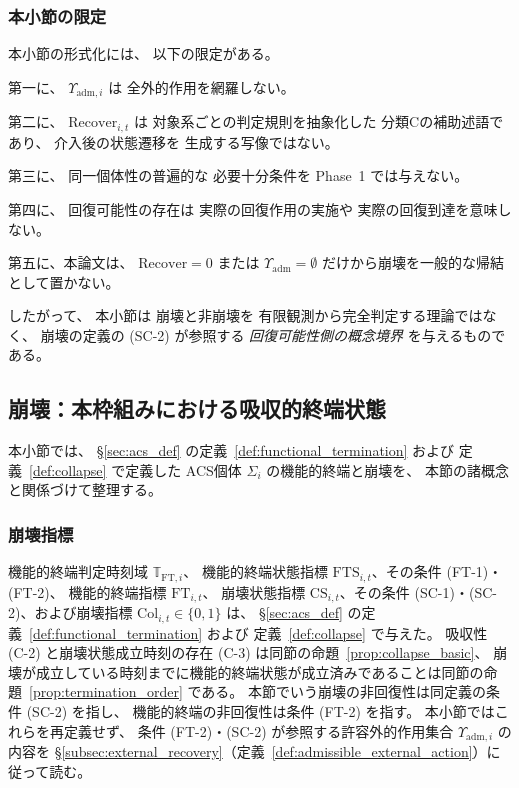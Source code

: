 \subsubsection{本小節の限定}

\begin{remark}
\label{rem:external_recovery_phase1_scope}
本小節の形式化には、
以下の限定がある。

第一に、
$\Upsilon_{\mathrm{adm},i}$ は
全外的作用を網羅しない。

第二に、
$\mathrm{Recover}_{i,t}$ は
対象系ごとの判定規則を抽象化した
分類Cの補助述語であり、
介入後の状態遷移を
生成する写像ではない。

第三に、
同一個体性の普遍的な
必要十分条件を
Phase~1 では与えない。

第四に、
回復可能性の存在は
実際の回復作用の実施や
実際の回復到達を意味しない。

第五に、本論文は、
$\mathrm{Recover}=0$ または
$\Upsilon_{\mathrm{adm}}=\emptyset$
だけから崩壊を一般的な帰結として置かない。

したがって、
本小節は
崩壊と非崩壊を
有限観測から完全判定する理論ではなく、
崩壊の定義の (SC-2) が参照する
\emph{回復可能性側の概念境界}
を与えるものである。
\end{remark}

\subsection{崩壊：本枠組みにおける吸収的終端状態}
\label{subsec:collapse_def}

本小節では、
\S\ref{sec:acs_def} の定義~\ref{def:functional_termination} および
定義~\ref{def:collapse} で定義した
ACS個体 $\Sigma_i$ の機能的終端と崩壊を、
本節の諸概念と関係づけて整理する。

\subsubsection{崩壊指標}

機能的終端判定時刻域 $\mathbb{T}_{\mathrm{FT},i}$、
機能的終端状態指標 $\mathrm{FTS}_{i,t}$、その条件 (FT-1)・(FT-2)、
機能的終端指標 $\mathrm{FT}_{i,t}$、
崩壊状態指標 $\mathrm{CS}_{i,t}$、その条件 (SC-1)・(SC-2)、および崩壊指標
$\mathrm{Col}_{i,t}\in\{0,1\}$ は、
\S\ref{sec:acs_def} の定義~\ref{def:functional_termination} および
定義~\ref{def:collapse} で与えた。
吸収性 (C-2) と崩壊状態成立時刻の存在 (C-3) は同節の命題~\ref{prop:collapse_basic}、
崩壊が成立している時刻までに機能的終端状態が成立済みであることは同節の命題~\ref{prop:termination_order} である。
本節でいう崩壊の非回復性は同定義の条件 (SC-2) を指し、
機能的終端の非回復性は条件 (FT-2) を指す。
本小節ではこれらを再定義せず、
条件 (FT-2)・(SC-2) が参照する許容外的作用集合 $\Upsilon_{\mathrm{adm},i}$ の内容を
\S\ref{subsec:external_recovery}（定義~\ref{def:admissible_external_action}）に従って読む。


